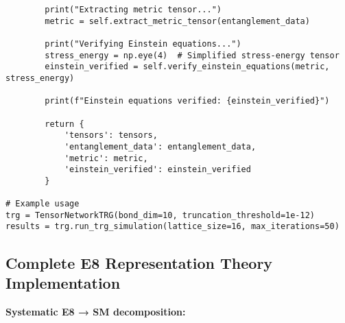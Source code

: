 \documentclass[11pt]{article}
\theoremstyle{definition}
\begin{document}
\begin{verbatim}
        print("Extracting metric tensor...")
        metric = self.extract_metric_tensor(entanglement_data)
        
        print("Verifying Einstein equations...")
        stress_energy = np.eye(4)  # Simplified stress-energy tensor
        einstein_verified = self.verify_einstein_equations(metric, stress_energy)
        
        print(f"Einstein equations verified: {einstein_verified}")
        
        return {
            'tensors': tensors,
            'entanglement_data': entanglement_data,
            'metric': metric,
            'einstein_verified': einstein_verified
        }

# Example usage
trg = TensorNetworkTRG(bond_dim=10, truncation_threshold=1e-12)
results = trg.run_trg_simulation(lattice_size=16, max_iterations=50)
\end{verbatim}

\subsection{Complete E8 Representation Theory Implementation}

\textbf{Systematic E8 → SM decomposition:}
\end{document}
